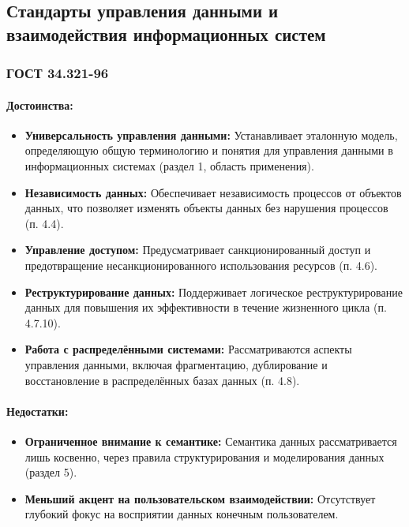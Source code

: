 \subsection{Стандарты управления данными и взаимодействия информационных систем}

\subsubsection*{ГОСТ 34.321-96}

\paragraph{Достоинства:}
\begin{itemize}
    \item \textbf{Универсальность управления данными:} Устанавливает эталонную модель, определяющую общую терминологию
    и понятия для управления данными в информационных системах (раздел 1, область применения).
    \item \textbf{Независимость данных:} Обеспечивает независимость процессов от объектов данных, что позволяет изменять
    объекты данных без нарушения процессов (п. 4.4).
    \item \textbf{Управление доступом:} Предусматривает санкционированный доступ и предотвращение несанкционированного
    использования ресурсов (п. 4.6).
    \item \textbf{Реструктурирование данных:} Поддерживает логическое реструктурирование данных для повышения их
    эффективности в течение жизненного цикла (п. 4.7.10).
    \item \textbf{Работа с распределёнными системами:} Рассматриваются аспекты управления данными, включая фрагментацию,
    дублирование и восстановление в распределённых базах данных (п. 4.8).
\end{itemize}

\paragraph{Недостатки:}
\begin{itemize}
    \item \textbf{Ограниченное внимание к семантике:} Семантика данных рассматривается лишь косвенно, через правила
    структурирования и моделирования данных (раздел 5).
    \item \textbf{Меньший акцент на пользовательском взаимодействии:} Отсутствует глубокий фокус на восприятии данных
    конечным пользователем.
\end{itemize}

